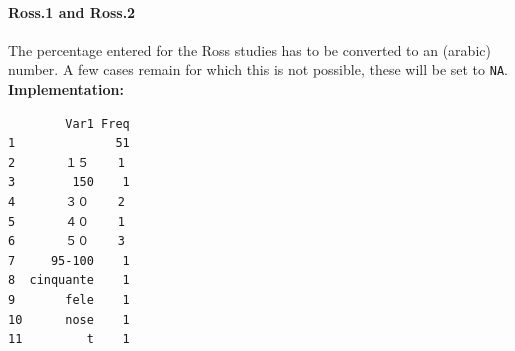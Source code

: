 \documentclass[]{article}
\newenvironment{Shaded}{\begin{snugshade}}{\end{snugshade}}
\newcommand{\KeywordTok}[1]{\textcolor[rgb]{0.94,0.87,0.69}{{#1}}}
\newcommand{\DataTypeTok}[1]{\textcolor[rgb]{0.87,0.87,0.75}{{#1}}}
\newcommand{\DecValTok}[1]{\textcolor[rgb]{0.86,0.86,0.80}{{#1}}}
\newcommand{\CharTok}[1]{\textcolor[rgb]{0.86,0.64,0.64}{{#1}}}
\newcommand{\StringTok}[1]{\textcolor[rgb]{0.80,0.58,0.58}{{#1}}}
\newcommand{\CommentTok}[1]{\textcolor[rgb]{0.50,0.62,0.50}{{#1}}}
\newcommand{\OtherTok}[1]{\textcolor[rgb]{0.94,0.94,0.56}{{#1}}}
\newcommand{\NormalTok}[1]{\textcolor[rgb]{0.80,0.80,0.80}{{#1}}}
\begin{document}
\paragraph{Ross.1 and Ross.2}\label{ross.1-and-ross.2}

The percentage entered for the Ross studies has to be converted to an
(arabic) number. A few cases remain for which this is not possible,
these will be set to \texttt{NA}. \textbf{Implementation:}

\begin{Shaded}
\end{Shaded}

\begin{verbatim}
        Var1 Freq
1              51
2       １５    1
3        150    1
4       ３０    2
5       ４０    1
6       ５０    3
7     95-100    1
8  cinquante    1
9       fele    1
10      nose    1
11         t    1
\end{verbatim}
\end{document}
